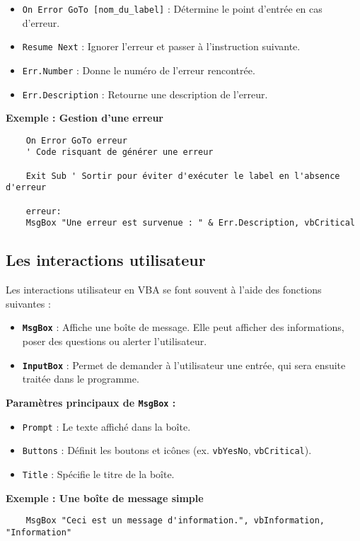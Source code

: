 \documentclass[a4paper,12pt]{report}
\begin{document}
\begin{itemize}
	\item \texttt{On Error GoTo [nom\_du\_label]} : Détermine le point d'entrée en cas d'erreur.
	\item \texttt{Resume Next} : Ignorer l'erreur et passer à l'instruction suivante.
	\item \texttt{Err.Number} : Donne le numéro de l'erreur rencontrée.
	\item \texttt{Err.Description} : Retourne une description de l'erreur.
\end{itemize}
\newpage
\textbf{Exemple : Gestion d'une erreur}
\begin{lstlisting}
	On Error GoTo erreur
	' Code risquant de générer une erreur
	
	Exit Sub ' Sortir pour éviter d'exécuter le label en l'absence d'erreur
	
	erreur:
	MsgBox "Une erreur est survenue : " & Err.Description, vbCritical
\end{lstlisting}

\subsection{Les interactions utilisateur}

Les interactions utilisateur en VBA se font souvent à l'aide des fonctions suivantes :

\begin{itemize}
	\item \textbf{\texttt{MsgBox}} : Affiche une boîte de message. Elle peut afficher des informations, poser des questions ou alerter l'utilisateur.
	\item \textbf{\texttt{InputBox}} : Permet de demander à l'utilisateur une entrée, qui sera ensuite traitée dans le programme.
\end{itemize}

\textbf{Paramètres principaux de \texttt{MsgBox} :}
\begin{itemize}
	\item \texttt{Prompt} : Le texte affiché dans la boîte.
	\item \texttt{Buttons} : Définit les boutons et icônes (ex. \texttt{vbYesNo}, \texttt{vbCritical}).
	\item \texttt{Title} : Spécifie le titre de la boîte.
\end{itemize}

\textbf{Exemple : Une boîte de message simple}
\begin{lstlisting}
	MsgBox "Ceci est un message d'information.", vbInformation, "Information"
\end{lstlisting}
\end{document}
